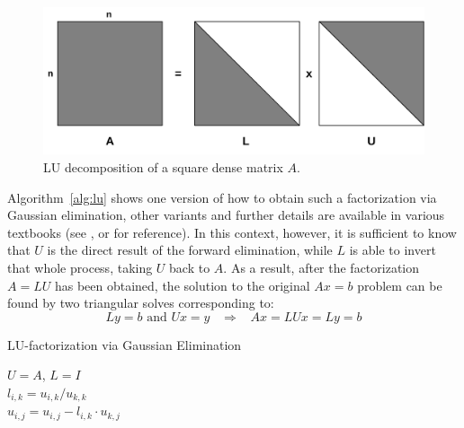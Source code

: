 \begin{figure}[h]
    \centering
    \includegraphics[width=0.75\linewidth]{figures/lu.pdf}
    \caption[LU Decomposition]{LU decomposition of a square dense matrix $A$.}
    \label{fig:lu_decomposition}
\end{figure}

\noindent Algorithm~\hyperref[alg:lu]{\ref{alg:lu}} shows one version of how to obtain such a factorization via Gaussian elimination, other variants and further details are available in various textbooks (see \cite{strang_introduction_2009}, \cite{golub_matrix_2013} or \cite{singh_linear_2014} for reference). In this context, however, it is sufficient to know that $U$ is the direct result of the forward elimination, while $L$ is able to invert that whole process, taking $U$ back to $A$. As a result, after the factorization $A=LU$ has been obtained, the solution to the original $Ax=b$ problem can be found by two triangular solves corresponding to:
\begin{equation}
    Ly=b \text{ and } Ux=y 	\;\;\; \Rightarrow \;\;\; Ax=LUx=Ly=b
\end{equation}

\begin{algorithm}[h]
  \caption{LU-factorization via Gaussian Elimination}
  \label{alg:lu}
  \SetAlgoLined
  $U=A$, $L=I$ \\
   {
     {
      $l_{i, k} = u_{i, k} / u_{k, k}$ \\
       {
        $u_{i, j} = u_{i, j} - l_{i, k} \cdot u_{k,j}$
      }
    }
  }
\end{algorithm}

